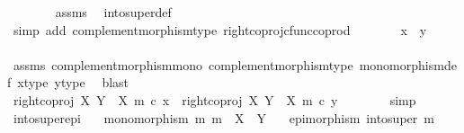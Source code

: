 \begin{isabellebody}
\ \ \ \ \ \ \isamarkupfalse%
\ assms\ \isamarkupfalse%
\ into{\isacharunderscore}{\kern0pt}super{\isacharunderscore}{\kern0pt}def\isanewline
\ \ \ \ \ \ \isamarkupfalse%
\ {\isacharparenleft}{\kern0pt}simp\ add{\isacharcolon}{\kern0pt}\ complement{\isacharunderscore}{\kern0pt}morphism{\isacharunderscore}{\kern0pt}type\ right{\isacharunderscore}{\kern0pt}coproj{\isacharunderscore}{\kern0pt}cfunc{\isacharunderscore}{\kern0pt}coprod{\isacharparenright}{\kern0pt}\isanewline
\ \ \ \ \isamarkupfalse%
\ \isamarkupfalse%
\ {\isachardoublequoteopen}x{\isacharprime}{\kern0pt}\ {\isacharequal}{\kern0pt}\ y{\isacharprime}{\kern0pt}{\isachardoublequoteclose}\isanewline
\ \ \ \ \ \ \isamarkupfalse%
\ assms\ complement{\isacharunderscore}{\kern0pt}morphism{\isacharunderscore}{\kern0pt}mono\ complement{\isacharunderscore}{\kern0pt}morphism{\isacharunderscore}{\kern0pt}type\ monomorphism{\isacharunderscore}{\kern0pt}def{}\ x{\isacharprime}{\kern0pt}{\isacharunderscore}{\kern0pt}type\ y{\isacharprime}{\kern0pt}{\isacharunderscore}{\kern0pt}type\ \isamarkupfalse%
\ blast\isanewline
\ \ \ \ \isamarkupfalse%
\ \isamarkupfalse%
\ {\isachardoublequoteopen}right{\isacharunderscore}{\kern0pt}coproj\ X\ {\isacharparenleft}{\kern0pt}Y\ {\isasymsetminus}\ {\isacharparenleft}{\kern0pt}X{\isacharcomma}{\kern0pt}\ m{\isacharparenright}{\kern0pt}{\isacharparenright}{\kern0pt}\ {\isasymcirc}\isactrlsub c\ x{\isacharprime}{\kern0pt}\ {\isacharequal}{\kern0pt}\ right{\isacharunderscore}{\kern0pt}coproj\ X\ {\isacharparenleft}{\kern0pt}Y\ {\isasymsetminus}\ {\isacharparenleft}{\kern0pt}X{\isacharcomma}{\kern0pt}\ m{\isacharparenright}{\kern0pt}{\isacharparenright}{\kern0pt}\ {\isasymcirc}\isactrlsub c\ y{\isacharprime}{\kern0pt}{\isachardoublequoteclose}\isanewline
\ \ \ \ \ \ \isamarkupfalse%
\ simp\isanewline
\ \ \isamarkupfalse%
\isanewline
{}\isamarkupfalse%
%
\endisatagproof
{\isafoldproof}%
%
\isadelimproof
\isanewline
%
\endisadelimproof
\isanewline
{}\isamarkupfalse%
\ into{\isacharunderscore}{\kern0pt}super{\isacharunderscore}{\kern0pt}epi{\isacharcolon}{\kern0pt}\isanewline
\ \ \ {\isachardoublequoteopen}monomorphism\ m{\isachardoublequoteclose}\ {\isachardoublequoteopen}m\ {\isacharcolon}{\kern0pt}\ X\ {\isasymrightarrow}\ Y{\isachardoublequoteclose}\isanewline
\ \ \ {\isachardoublequoteopen}epimorphism\ {\isacharparenleft}{\kern0pt}into{\isacharunderscore}{\kern0pt}super\ m{\isacharparenright}{\kern0pt}{\isachardoublequoteclose}\isanewline

\end{isabellebody}
